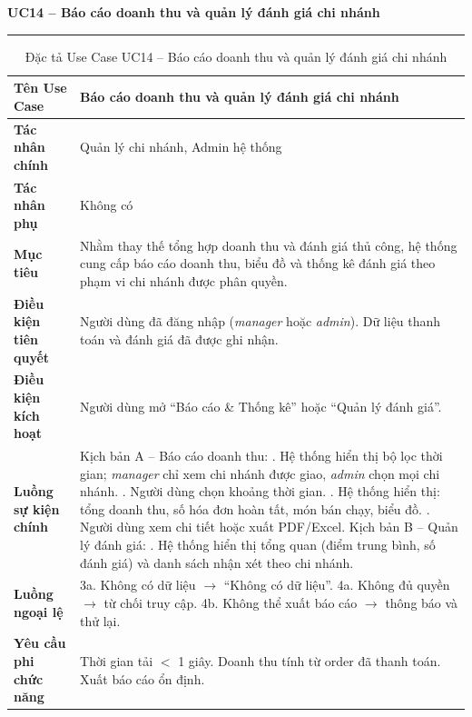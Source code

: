 ﻿\documentclass[../DoAn.tex]{subfiles}
\newcommand{\UCtitle}[1]{%
    \vspace{0.5em}
    {\large\bfseries #1}\\[-0.5em]
    \rule{\textwidth}{0.5pt}
    \vspace{0.3em}
}
\begin{document}
\begin{table}[H]
\UCtitle{UC14 – Báo cáo doanh thu và quản lý đánh giá chi nhánh}
\centering
\begin{tabular}{|p{4cm}|p{10.2cm}|}
\hline
\textbf{Tên Use Case} & Báo cáo doanh thu và quản lý đánh giá chi nhánh \\ \hline
\textbf{Tác nhân chính} & Quản lý chi nhánh, Admin hệ thống \\ \hline
\textbf{Tác nhân phụ} & Không có \\ \hline
\textbf{Mục tiêu} &
Nhằm thay thế tổng hợp doanh thu và đánh giá thủ công, hệ thống cung cấp báo cáo doanh thu, biểu đồ và thống kê đánh giá theo phạm vi chi nhánh được phân quyền.
\\ \hline
\textbf{Điều kiện tiên quyết} &
Người dùng đã đăng nhập (\textit{manager} hoặc \textit{admin}). Dữ liệu thanh toán và đánh giá đã được ghi nhận.
\\ \hline
\textbf{Điều kiện kích hoạt} &
Người dùng mở ``Báo cáo \& Thống kê'' hoặc ``Quản lý đánh giá''.
\\ \hline
\textbf{Luồng sự kiện chính} &
Kịch bản A -- Báo cáo doanh thu: \newline
1. Hệ thống hiển thị bộ lọc thời gian; \textit{manager} chỉ xem chi nhánh được giao, \textit{admin} chọn mọi chi nhánh. \newline
2. Người dùng chọn khoảng thời gian. \newline
3. Hệ thống hiển thị: tổng doanh thu, số hóa đơn hoàn tất, món bán chạy, biểu đồ. \newline
4. Người dùng xem chi tiết hoặc xuất PDF/Excel. \newline
Kịch bản B -- Quản lý đánh giá: \newline
5. Hệ thống hiển thị tổng quan (điểm trung bình, số đánh giá) và danh sách nhận xét theo chi nhánh.
\\ \hline
\textbf{Luồng ngoại lệ} &
3a. Không có dữ liệu $\rightarrow$ ``Không có dữ liệu''. \newline
4a. Không đủ quyền $\rightarrow$ từ chối truy cập. \newline
4b. Không thể xuất báo cáo $\rightarrow$ thông báo và thử lại.
\\ \hline
\textbf{Yêu cầu phi chức năng} &
Thời gian tải $<$ 1 giây. Doanh thu tính từ order đã thanh toán. Xuất báo cáo ổn định.
\\ \hline
\end{tabular}
\caption{Đặc tả Use Case UC14 – Báo cáo doanh thu và quản lý đánh giá chi nhánh}
\end{table}
\end{document}

